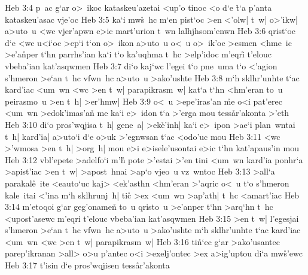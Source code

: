 \vs Heb 3:4
p~ac
g`ar
o>~ikoc
kataskeu'azetai
<up'o
tinoc
<o
d`e
\r{t}`a
p'anta
kataskeu'asac
vje'oc\bibvsend
\vs Heb 3:5
ka`i
mw\r{s}~hc
m`en
pist`oc
>en
<'olw|
t~w|
o>'ikw|
a>uto~u
<wc
vjer'apwn
e>ic
mart'urion
t~wn
lalhjhsom'enwn\bibvsend
\vs Heb 3:6
qrist`oc
d`e
<wc
u<i`oc
>ep`i
t`on
o>~ikon
a>uto~u
o<~u
o>~ik'oc
>esmen
<hme~ic
>e'a\r{n}per
t`hn
parrhs'ian
ka`i
t`o
ka'uqhma
t~hc
>elp'idoc
m'eqri\r{}
t'elouc
vbeba'ian
kat'asqwmen\bibvsend
\vs Heb 3:7
di`o
kaj`wc
l'egei
t`o
pne~uma
t`o
<'agion
s'hmeron
>e`an
t~hc
vfwn~hc
a>uto~u
>ako'ushte\bibvsend
\vs Heb 3:8
m`h
sklhr'unhte
t`ac
kard'iac
<um~wn
<wc
>en
t~w|
parapikrasm~w|
kat`a
t`hn
<hm'eran
to~u
peirasmo~u
>en
t~h|
>er'hmw|\bibvsend
\vs Heb 3:9
o<~u
>epe'iras'an
\r{m}e
o<i
pat'erec
<um~wn
>edok'imas'an\r{}
me
ka`i
e>~idon
t`a
>'erga
mou
tess\r{a}r'akonta
>'eth\bibvsend
\vs Heb 3:10
di`o
pros'wqjisa
t~h|
gene~a|
>ek\r{e}'inh|
ka`i
e>~ipon
>ae`i
plan~wntai
t~h|
kard'ia|
a>uto`i
d`e
o>uk
>'egnwsan
t`ac
<odo'uc
mou\bibvsend
\vs Heb 3:11
<wc
>'wmosa
>en
t~h|
>org~h|
mou
e>i
e>isele'usontai
e>ic
t`hn
kat'apaus'in
mou\bibvsend
\vs Heb 3:12
vbl'epete
>adelfo`i
m'h\r{}
pote
>'estai
>'en
tini
<um~wn
kard'ia
ponhr`a
>apist'iac
>en
t~w|
>apost~hnai
>ap`o
vjeo~u
vz~wntoc\bibvsend
\vs Heb 3:13
>all`a
parakal\r{e}~ite
<eauto`uc
kaj>
<ek'asthn
<hm'eran
>'aqric
o<~u
t`o
s'hmeron
kale~itai
<'ina
m`h
sklhrunj~h|
tic\r{}
>ex
<um~wn
>ap'ath|
t~hc
<amart'iac\bibvsend
\vs Heb 3:14
m'etoqoi
g`ar
geg'onamen\r{}
to~u
qristo~u
>e'anper
t`hn
>arq`hn
t~hc
<upost'asewc
m'eqri
t'elouc
vbeba'ian
kat'asqwmen\bibvsend
\vs Heb 3:15
>en
t~w|
l'egesjai
s'hmeron
>e`an
t~hc
vfwn~hc
a>uto~u
>ako'ushte
m`h
sklhr'unhte
t`ac
kard'iac
<um~wn
<wc
>en
t~w|
parapikrasm~w|\bibvsend
\vs Heb 3:16
ti\r{n}`ec
g`ar
>ako'usantec
parep'ikranan
>all>
o>u
p'antec
o<i
>exelj'ontec
>ex
a>ig'uptou
di`a
mw\r{s}'ewc\bibvsend
{}
\vs Heb 3:17
t'isin
d`e
pros'wqjisen
tess\r{a}r'akonta
